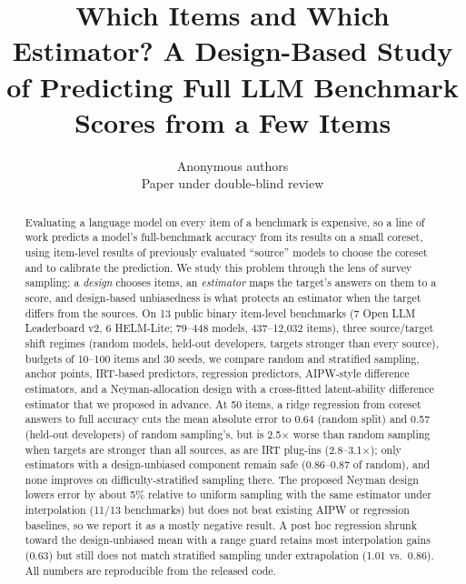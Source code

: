 \documentclass{article}
\title{Which Items and Which Estimator? A Design-Based Study of Predicting Full LLM Benchmark Scores from a Few Items}
\author{Anonymous authors\\ Paper under double-blind review}
\begin{document}
\maketitle

\begin{abstract}
Evaluating a language model on every item of a benchmark is expensive, so a line of work predicts a model's full-benchmark accuracy from its results on a small coreset, using item-level results of previously evaluated ``source'' models to choose the coreset and to calibrate the prediction.
We study this problem through the lens of survey sampling: a \emph{design} chooses items, an \emph{estimator} maps the target's answers on them to a score, and design-based unbiasedness is what protects an estimator when the target differs from the sources.
On 13 public binary item-level benchmarks (7 Open LLM Leaderboard v2, 6 HELM-Lite; 79--448 models, 437--12{,}032 items), three source/target shift regimes (random models, held-out developers, targets stronger than every source), budgets of 10--100 items and 30 seeds, we compare random and stratified sampling, anchor points, IRT-based predictors, regression predictors, AIPW-style difference estimators, and a Neyman-allocation design with a cross-fitted latent-ability difference estimator that we proposed in advance.
At 50 items, a ridge regression from coreset answers to full accuracy cuts the mean absolute error to 0.64 (random split) and 0.57 (held-out developers) of random sampling's, but is 2.5$\times$ worse than random sampling when targets are stronger than all sources, as are IRT plug-ins (2.8--3.1$\times$); only estimators with a design-unbiased component remain safe (0.86--0.87 of random), and none improves on difficulty-stratified sampling there.
The proposed Neyman design lowers error by about 5\% relative to uniform sampling with the same estimator under interpolation (11/13 benchmarks) but does not beat existing AIPW or regression baselines, so we report it as a mostly negative result.
A post hoc regression shrunk toward the design-unbiased mean with a range guard retains most interpolation gains (0.63) but still does not match stratified sampling under extrapolation (1.01 vs.\ 0.86).
All numbers are reproducible from the released code.
\end{abstract}
\end{document}
